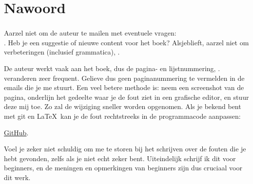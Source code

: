 \part*{Nawoord}

\section{\NLph{}}

Aarzel niet om de auteur te mailen met eventuele vragen: \\
\GTT{<\EMAIL>}.
Heb je een suggestie of nieuwe content voor het boek?
Alsjeblieft, aarzel niet om verbeteringen (inclusief grammatica), \etc.

De auteur werkt vaak aan het boek, dus de pagina- en lijstnummering, \etc. veranderen zeer frequent.
Gelieve dus geen paginanummering te vermelden in de emails die je me stuurt.
Een veel betere methode is: neem een screenshot van de pagina, onderlijn het gedeelte waar je de fout ziet in een grafische editor,
en stuur deze mij toe. Zo zal de wijziging sneller worden opgenomen.
Als je bekend bent met git en \LaTeX\, kan je de fout rechtstreeks in de programmacode aanpassen:

\href{http://go.yurichev.com/17089}{GitHub}.

Voel je zeker niet schuldig om me te storen bij het schrijven over de fouten die je hebt gevonden, zelfs als je niet echt zeker bent.
Uiteindelijk schrijf ik dit voor beginners, en de meningen en opmerkingen van beginners zijn dus cruciaal voor dit werk.

